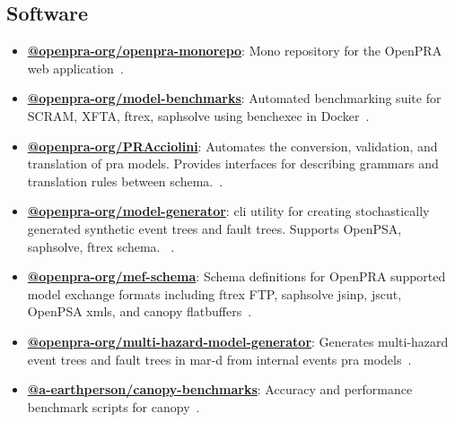 \subsection{Software}
\begin{itemize}
    \item {\textbf{\href{https://github.com/openpra-org/openpra-monorepo}{@openpra-org/openpra-monorepo}}: Mono repository for the OpenPRA web application~\cite{openpra_initiative_openpra_2024}}.
    
    \item {\textbf{\href{https://github.com/openpra-org/model-benchmarks}{@openpra-org/model-benchmarks}}: Automated benchmarking suite for SCRAM, XFTA, \acrshort{ftrex}, \acrshort{saphsolve} using benchexec in Docker~\cite{earthperson_pra_2025}}.

    \item {\textbf{\href{https://github.com/openpra-org/PRAcciolini}{@openpra-org/PRAcciolini}}: Automates the conversion, validation, and translation of \acrshort{pra} models. Provides interfaces for describing grammars and translation rules between schema.~\cite{earthperson_pracciolini_2024}}.
    
    \item {\textbf{\href{https://github.com/openpra-org/model-generator}{@openpra-org/model-generator}}: \acrshort{cli} utility for creating stochastically generated synthetic event trees and fault trees. Supports OpenPSA, \acrshort{saphsolve}, \acrshort{ftrex} schema. ~\cite{earthperson_pra_2022}}.
    
    \item {\textbf{\href{https://github.com/openpra-org/mef-schema}{@openpra-org/mef-schema}}: Schema definitions for OpenPRA supported model exchange formats including \acrshort{ftrex} FTP, \acrshort{saphsolve} \acrshort{jsinp}, \acrshort{jscut}, OpenPSA \acrshort{xml}s, and canopy flatbuffers~\cite{earthperson_pra_2024}}.
    
    \item {\textbf{\href{https://github.com/openpra-org/multi-hazard-model-generator}{@openpra-org/multi-hazard-model-generator}}: Generates multi-hazard event trees and fault trees in \acrshort{mar-d} from internal events \acrshort{pra} models~\cite{batikh_multi_2023}}.
    
    \item {\textbf{\href{https://github.com/a-earthperson/canopy-benchmarks}{@a-earthperson/canopy-benchmarks}}: Accuracy and performance benchmark scripts for canopy~\cite{earthperson_canopy_2025}}.
\end{itemize}